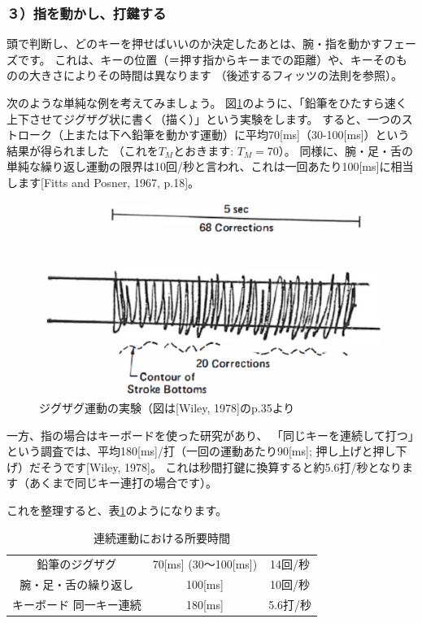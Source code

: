 \subsubsection*{３）指を動かし、打鍵する}

頭で判断し、どのキーを押せばいいのか決定したあとは、腕・指を動かすフェーズです。
これは、キーの位置（＝押す指からキーまでの距離）や、キーそのものの大きさによりその時間は異なります
（後述するフィッツの法則を参照）。

次のような単純な例を考えてみましょう。
図\ref{fig:zigzag}のように、「鉛筆をひたすら速く上下させてジグザグ状に書く（描く）」という実験をします。
すると、一つのストローク（上または下へ鉛筆を動かす運動）に平均70[ms]（30-100[ms]）という結果が得られました
（これを$T_M$とおきます: $T_M = 70$）。
同様に、腕・足・舌の単純な繰り返し運動の限界は10回/秒と言われ、これは一回あたり100[ms]に相当します[Fitts and Posner, 1967, p.18]。

\begin{figure}[htbp]
 \begin{center}
  \includegraphics[width=0.5\hsize]{zigzag.eps}
 \end{center}
 \caption{ジグザグ運動の実験（図は[Wiley, 1978]のp.35より}
 \label{fig:zigzag}
\end{figure}

一方、指の場合はキーボードを使った研究があり、
「同じキーを連続して打つ」という調査では、平均180[ms]/打（一回の運動あたり90[ms]; 押し上げと押し下げ）だそうです[Wiley, 1978]。
これは秒間打鍵に換算すると約5.6打/秒となります（あくまで同じキー連打の場合です）。

これを整理すると、表\ref{tbl:renzoku}のようになります。

\begin{table}
\begin{center}
\caption{連続運動における所要時間}
\begin{tabular}{ccc}
\hline
鉛筆のジグザグ & 70[ms] (30～100[ms]) & 14回/秒 \\
腕・足・舌の繰り返し & 100[ms] & 10回/秒 \\
キーボード 同一キー連続 & 180[ms] & 5.6打/秒 \\
\hline
\end{tabular}
\label{tbl:renzoku}
\end{center}
\end{table}

